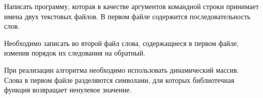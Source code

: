 

Написать программу, которая в качестве аргументов командной строки
принимает имена двух текстовых файлов. В первом файле содержится
последовательность слов.

Необходимо записать во второй файл слова,
содержащиеся в первом файле, изменив порядок их следования на
обратный.

При реализации алгоритма необходимо использовать
динамический массив. Слова в первом файле разделяются символами, для
которых библиотечная функция  возвращает ненулевое значение.
